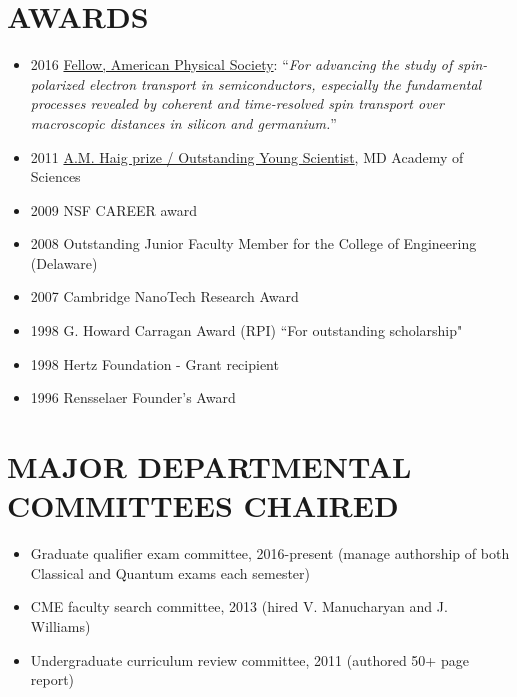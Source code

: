 \documentclass[paper=letter,fontsize=11pt]{scrartcl} %
\newcommand{\NewPart}[2]{\section*{\uppercase{#1} #2}}
\begin{document}
\NewPart{Awards}{}
\begin{itemize}
\item 2016 \href{https://www.aps.org/programs/honors/fellowships/archive-all.cfm?initial=&year=2016&unit_id=DCMP&institution=University+of+Maryland%2C+College+Park}{Fellow, American Physical Society}: “\textit{For advancing the study of spin-polarized electron transport in semiconductors, especially the fundamental processes revealed by coherent and time-resolved spin transport over macroscopic distances in silicon and germanium.}”
\item 2011 \href{http://www.mdsci.org/programs/outstanding-young-scientist-outstanding-young-engineer/past-oys-recipients/}{A.M. Haig prize / Outstanding Young Scientist}, MD Academy of Sciences
\item 2009 NSF CAREER award
\item 2008 Outstanding Junior Faculty Member for the College of Engineering (Delaware)
\item 2007 Cambridge NanoTech Research Award 
\item 1998 G. Howard Carragan Award (RPI) ``For outstanding scholarship"
\item 1998 Hertz Foundation - Grant recipient
\item 1996 Rensselaer Founder's Award
\end{itemize}

\NewPart{Major Departmental Committees Chaired}{}
\begin{itemize}
\item Graduate qualifier exam committee, 2016-present (manage authorship of both Classical and Quantum exams each semester)
\item CME faculty search committee, 2013 (hired V. Manucharyan and J. Williams)
\item Undergraduate curriculum review committee, 2011 (authored 50+ page report)
\end{itemize}

\end{document}
